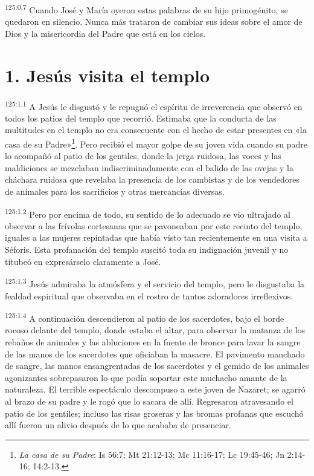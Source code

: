 \par 
\textsuperscript{125:0.7} Cuando José y María oyeron estas palabras de su hijo primogénito, se quedaron en silencio. Nunca más trataron de cambiar sus ideas sobre el amor de Dios y la misericordia del Padre que está en los cielos.

\section*{1. Jesús visita el templo}
\par 
\textsuperscript{125:1.1} A Jesús le disgustó y le repugnó el espíritu de irreverencia que observó en todos los patios del templo que recorrió. Estimaba que la conducta de las multitudes en el templo no era consecuente con el hecho de estar presentes en «la casa de su Padre»\footnote{\textit{La casa de su Padre}: Is 56:7; Mt 21:12-13; Mc 11:16-17; Lc 19:45-46; Jn 2:14-16; 14:2-13.}. Pero recibió el mayor golpe de su joven vida cuando su padre lo acompañó al patio de los gentiles, donde la jerga ruidosa, las voces y las maldiciones se mezclaban indiscriminadamente con el balido de las ovejas y la cháchara ruidosa que revelaba la presencia de los cambistas y de los vendedores de animales para los sacrificios y otras mercancías diversas.

\par 
\textsuperscript{125:1.2} Pero por encima de todo, su sentido de lo adecuado se vio ultrajado al observar a las frívolas cortesanas que se pavoneaban por este recinto del templo, iguales a las mujeres repintadas que había visto tan recientemente en una visita a Séforis. Esta profanación del templo suscitó toda su indignación juvenil y no titubeó en expresárselo claramente a José.

\par 
\textsuperscript{125:1.3} Jesús admiraba la atmósfera y el servicio del templo, pero le disgustaba la fealdad espiritual que observaba en el rostro de tantos adoradores irreflexivos.

\par 
\textsuperscript{125:1.4} A continuación descendieron al patio de los sacerdotes, bajo el borde rocoso delante del templo, donde estaba el altar, para observar la matanza de los rebaños de animales y las abluciones en la fuente de bronce para lavar la sangre de las manos de los sacerdotes que oficiaban la masacre. El pavimento manchado de sangre, las manos ensangrentadas de los sacerdotes y el gemido de los animales agonizantes sobrepasaron lo que podía soportar este muchacho amante de la naturaleza. El terrible espectáculo descompuso a este joven de Nazaret; se agarró al brazo de su padre y le rogó que lo sacara de allí. Regresaron atravesando el patio de los gentiles; incluso las risas groseras y las bromas profanas que escuchó allí fueron un alivio después de lo que acababa de presenciar.

